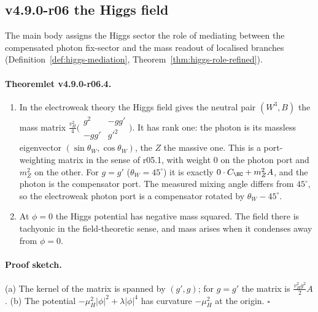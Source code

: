 \subsection*{v4.9.0-r06 the Higgs field}
\label{subsec:v490-r06-higgs}

The main body assigns the Higgs sector the role of mediating between the compensated photon fix-sector and the mass
readout of localised branches (Definition~\ref{def:higgs-mediation}, Theorem~\ref{thm:higgs-role-refined}).

\paragraph{Theoremlet v4.9.0-r06.4.}
\begin{enumerate}[leftmargin=2em]
\item[(a)] In the electroweak theory the Higgs field gives the neutral pair \((W^3,B)\) the mass matrix
\(\tfrac{v_H^2}{4}\bigl(\begin{smallmatrix}g^2&-gg'\\-gg'&g'^2\end{smallmatrix}\bigr)\).  It has rank one: the photon is its massless
eigenvector \((\sin\theta_W,\cos\theta_W)\), the \(Z\) the massive one.  This is a port-weighting matrix in the sense of
r05.1, with weight \(0\) on the photon port and \(m_Z^2\) on the other.  For \(g=g'\) (\(\theta_W=45^\circ\)) it is exactly
\(0\cdot C_{\HC}+m_Z^2A\), and the photon is the compensator port.  The measured mixing angle differs from \(45^\circ\), so the
electroweak photon port is a compensator rotated by \(\theta_W-45^\circ\).
\item[(b)] At \(\phi=0\) the Higgs potential has negative mass squared.  The field there is tachyonic in the
field-theoretic sense, and mass arises when it condenses away from \(\phi=0\).
\end{enumerate}

\paragraph{Proof sketch.}
(a) The kernel of the matrix is spanned by \((g',g)\); for \(g=g'\) the matrix is \(\tfrac{v_H^2g^2}{2}A\).  (b) The
potential \(-\mu_H^2|\phi|^2+\lambda|\phi|^4\) has curvature \(-\mu_H^2\) at the origin.  \(\square\)

